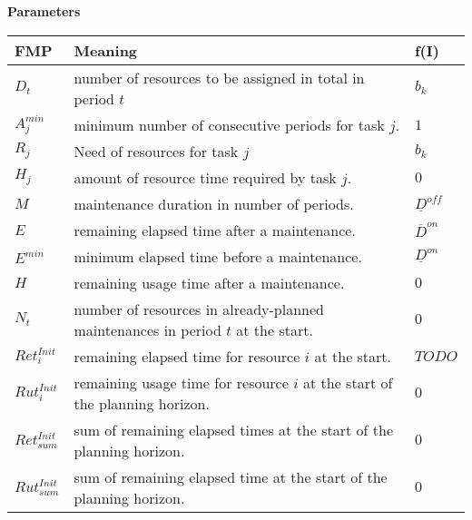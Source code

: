 \documentclass[a4paper,11pt]{article}
\begin{document}
    \vskip 0.3cm

    \textbf{Parameters}

    \begin{tabular}{l|l|l}
        \textbf{FMP}      &  \textbf{Meaning} & \textbf{f(I)} \\ \hline
        $D_t$             & number of resources to be assigned in total in period $t$ & $ b_k $ \\
        $A^{min}_j$       & minimum number of consecutive periods for task $j$. & $ 1 $ \\
        $R_{j}$           & Need of resources for task $j$ & $ b_k $ \\
        $H_j$             & amount of resource time required by task $j$. & $ 0 $ \\
        $M$               & maintenance duration in number of periods. & $ \underline{D}^{off} $ \\
        $E$               & remaining elapsed time after a maintenance. & $ \overline{D}^{on} $ \\
        $E^{min}$         & minimum elapsed time before a maintenance. & $ \underline{D}^{on} $ \\
        $H$               & remaining usage time after a maintenance. & $ 0 $ \\
        $N_t$             & number of resources in already-planned maintenances in period $t$ at the start. & $ 0 $ \\
        $Ret^{Init}_{i}$  & remaining elapsed time for resource $i$ at the start. & $ TODO $ \\
        $Rut^{Init}_{i}$  & remaining usage time for resource $i$ at the start of the planning horizon. & $ 0 $ \\
        $Ret^{Init}_{sum}$& sum of remaining elapsed times at the start of the planning horizon. & $ 0 $\\
        $Rut^{Init}_{sum}$& sum of remaining elapsed time at the start of the planning horizon. & $ 0 $ \\
    \end{tabular}



\end{document}
